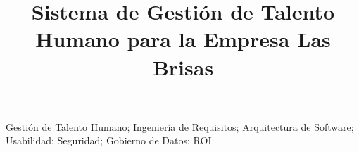 \documentclass[conference]{IEEEtran}
\begin{document}
\title{Sistema de Gestión de Talento Humano para la Empresa Las Brisas}

\author{
}

\maketitle

\begin{abstract}

\end{abstract}

\begin{IEEEkeywords}
Gestión de Talento Humano; Ingeniería de Requisitos; Arquitectura de Software; Usabilidad; Seguridad; Gobierno de Datos; ROI.
\end{IEEEkeywords}










\printbibliography
\end{document}
